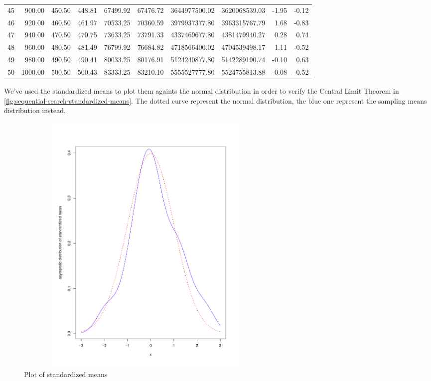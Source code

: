 \documentclass[twoside,openright,titlepage,fleqn,
	headinclude,11pt,a4paper,BCOR5mm,footinclude
	]{scrbook}
\begin{document}
\begin{table}[ht]
\begin{center}
{\begin{tabular}{rrrrrrrrrr}
        45 & 900.00 & 450.50 & 448.81 & 67499.92 & 67476.72 & 3644977500.02 & 3620068539.03 & -1.95 & -0.12 \\ 
        46 & 920.00 & 460.50 & 461.97 & 70533.25 & 70360.59 & 3979937377.80 & 3963315767.79 & 1.68 & -0.83 \\ 
        47 & 940.00 & 470.50 & 470.75 & 73633.25 & 73791.33 & 4337469677.80 & 4381479940.27 & 0.28 & 0.74 \\ 
        48 & 960.00 & 480.50 & 481.49 & 76799.92 & 76684.82 & 4718566400.02 & 4704539498.17 & 1.11 & -0.52 \\ 
        49 & 980.00 & 490.50 & 490.41 & 80033.25 & 80176.91 & 5124240877.80 & 5142289190.74 & -0.10 & 0.63 \\ 
        50 & 1000.00 & 500.50 & 500.43 & 83333.25 & 83210.10 & 5555527777.80 & 5524755813.88 & -0.08 & -0.52 \\ 
        \hline
      \end{tabular}
    }
  \end{center}
\end{table}

We've used the standardized means to plot them againts the normal
distribution in order to verify the Central Limit Theorem in
\autoref{fig:sequential-search-standardized-means}. The dotted curve
represent the normal distribution, the blue one represent the sampling
means distribution instead.
\begin{figure}[htb]
\centering
\includegraphics[height=13cm,width=13cm]{pictures/sequential-search-asymtotic-behaviour-of-standardized-means.pdf}
\caption{Plot of standardized means}
\label{fig:sequential-search-standardized-means}
\end{figure}
\end{document}
